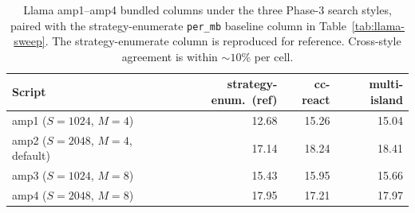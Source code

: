 \begin{table}[!htbp]
\centering\small
\setlength{\tabcolsep}{4pt}
\begin{tabular}{lrrr}
\toprule
\textbf{Script}                       & \textbf{strategy-enum.\ (ref)} & \textbf{cc-react} & \textbf{multi-island} \\
\midrule
amp1 ($S{=}1024$, $M{=}4$)            & 12.68 & 15.26 & 15.04 \\
amp2 ($S{=}2048$, $M{=}4$, default)   & 17.14 & 18.24 & 18.41 \\
amp3 ($S{=}1024$, $M{=}8$)            & 15.43 & 15.95 & 15.66 \\
amp4 ($S{=}2048$, $M{=}8$)            & 17.95 & 17.21 & 17.97 \\
\bottomrule
\end{tabular}
\caption{Llama amp1--amp4 bundled columns under the three
Phase-3 search styles, paired with the strategy-enumerate
\texttt{per\_mb} baseline column in Table~\ref{tab:llama-sweep}.
The strategy-enumerate column is reproduced for reference.
Cross-style agreement is within $\sim$$10$\% per cell.}
\label{tab:ablation-llama-sweep}
\end{table}


